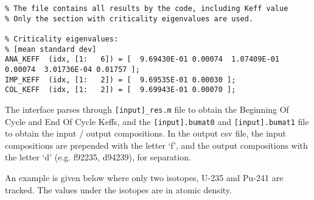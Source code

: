 \begin{lstlisting}[language={}]
% _res.m file
% The file contains all results by the code, including Keff value
% Only the section with criticality eigenvalues are used.

% Criticality eigenvalues:
% [mean standard dev]
ANA_KEFF  (idx, [1:   6]) = [  9.69430E-01 0.00074  1.07409E-01 0.00074  3.01736E-04 0.01757 ];
IMP_KEFF  (idx, [1:   2]) = [  9.69535E-01 0.00030 ];
COL_KEFF  (idx, [1:   2]) = [  9.69943E-01 0.00070 ];
\end{lstlisting}


The interface parses through \texttt{[input]\_res.m} file
to obtain the Beginning Of Cycle and End Of Cycle Keffs, and the 
\texttt{[input].bumat0} and \texttt{[input].bumat1} file to obtain the
input / output compositions. In the output csv file, the input compositions
are prepended with the letter `f', and the output compositions with the letter `d'
(e.g. f92235, d94239), for separation. 

An example is given below where only two isotopes, U-235 and Pu-241 are tracked.
The values under the isotopes are in atomic density.

\begin{table}[h]
  \centering
    \caption{Example csv file generated by RAVEN running SERPENT}
    \label{tab:ser-rav}
\end {table}

